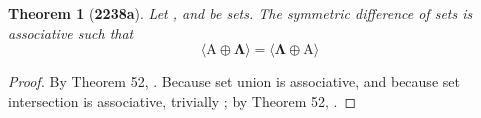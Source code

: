 \documentclass[preview]{standalone}
\newtheorem{theorem}{Theorem}
\begin{document}
\begin{theorem}[\textbf{2238a}]
    Let , and \bm{$\Lambda$} be sets. 
    The symmetric difference of sets is associative such that 
    \begin{equation*}
        \bm{
            \big \langle \mathrm{A} \oplus \Lambda \big \rangle
                = 
            \big \langle \Lambda \oplus \mathrm{A} \big \rangle
        }
    \end{equation*}
\end{theorem}
\begin{proof}
    By Theorem 52, 
    . 
    Because set union is associative, and because set intersection is associative,
    trivially 
    ;
    by Theorem 52, 
    .
\end{proof}
\end{document}
